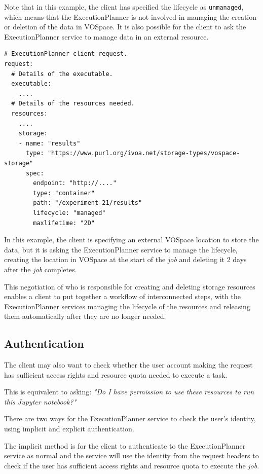 \documentclass[11pt,a4paper]{ivoa}
\newcommand{\vospace} {VOSpace}
\newcommand{\execplanner} {ExecutionPlanner}
\newcommand{\jupyternotebook} {Jupyter notebook}
\newcommand{\codeword}[1] {\texttt{#1}}
\newcommand{\job} {\textit{job}}
\newcommand{\task} {task}
\begin{document}
Note that in this example, the client has specified the lifecycle as \codeword{unmanaged},
which means that the \execplanner{} is not involved in managing the creation or deletion
of the data in \vospace.
It is also possible for the client to ask the \execplanner{} service to manage
data in an external resource.

\begin{lstlisting}[]
# ExecutionPlanner client request.
request:
  # Details of the executable.
  executable:
    ....
  # Details of the resources needed.
  resources:
    ....
    storage:
    - name: "results"
      type: "https://www.purl.org/ivoa.net/storage-types/vospace-storage"
      spec:
        endpoint: "http://...."
        type: "container"
        path: "/experiment-21/results"
        lifecycle: "managed"
        maxlifetime: "2D"
\end{lstlisting}

In this example, the client is specifying an external \vospace{} location to store the data,
but it is asking the \execplanner{} service to manage the lifecycle, creating the location
in \vospace{} at the start of the \job{} and deleting it 2 days after the \job{} completes.

This negotiation of who is responsible for creating and deleting storage resources
enables a client to put together a workflow of interconnected steps, with the
\execplanner{} services
managing the lifecycle of the resources and releasing them automatically after they
are no longer needed.

\subsection{Authentication}
\label{authentication}

The client may also want to check whether the user account making the request
has sufficient access rights and resource quota needed to execute a \task{}.

This is equivalent to asking:
\textit{"Do I have permission to use these resources to run this \jupyternotebook{}?"}

There are two ways for the \execplanner{} service to check the user's identity,
using implicit and explicit authentication.

The implicit method is for the client to authenticate to the \execplanner{} service
as normal and the service will use the identity from the request headers to check if the
user has sufficient access rights and resource quota to execute the \job{}.
\end{document}
